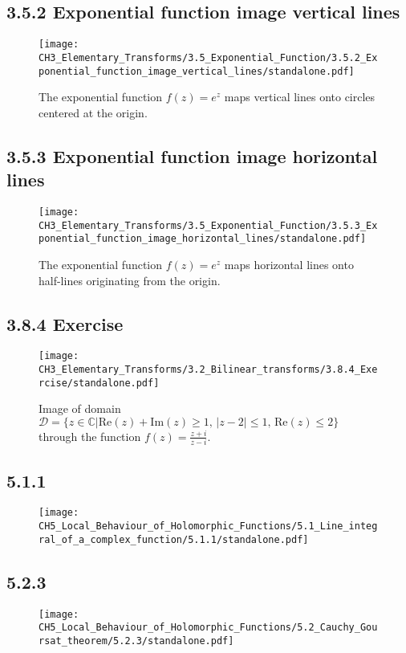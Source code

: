 \documentclass{book}
\begin{document}
\subsection*{3.5.2 Exponential function image vertical lines}
\begin{figure}[H]
\centering
\texttt{[image: CH3\_Elementary\_Transforms/3.5\_Exponential\_Function/3.5.2\_Exponential\_function\_image\_vertical\_lines/standalone.pdf]}
\caption{The exponential function $f(z) = e^z$ maps vertical lines onto circles centered at the origin.}
\end{figure}

\subsection*{3.5.3 Exponential function image horizontal lines}
\begin{figure}[H]
\centering
\texttt{[image: CH3\_Elementary\_Transforms/3.5\_Exponential\_Function/3.5.3\_Exponential\_function\_image\_horizontal\_lines/standalone.pdf]}
\caption{The exponential function $f(z) = e^z$ maps horizontal lines onto half-lines originating from the origin.}
\end{figure}

\subsection*{3.8.4 Exercise}
\begin{figure}[H]
\centering
\texttt{[image: CH3\_Elementary\_Transforms/3.2\_Bilinear\_transforms/3.8.4\_Exercise/standalone.pdf]}
\caption{Image of domain $\mathcal{D} = \{z\in \mathbb{C} \vert \mathrm{Re}(z) + \mathrm{Im}(z) \ge 1, \, \lvert z-2 \rvert \le 1, \, \mathrm{Re}(z) \le 2 \}$ through the function $f(z) = \frac{z+i}{z-i}$.}
\end{figure}

\subsection*{5.1.1}
\begin{figure}[H]
\centering
\texttt{[image: CH5\_Local\_Behaviour\_of\_Holomorphic\_Functions/5.1\_Line\_integral\_of\_a\_complex\_function/5.1.1/standalone.pdf]}
\caption{}
\end{figure}

\subsection*{5.2.3}
\begin{figure}[H]
\centering
\texttt{[image: CH5\_Local\_Behaviour\_of\_Holomorphic\_Functions/5.2\_Cauchy\_Goursat\_theorem/5.2.3/standalone.pdf]}
\caption{}
\end{figure}
\end{document}
